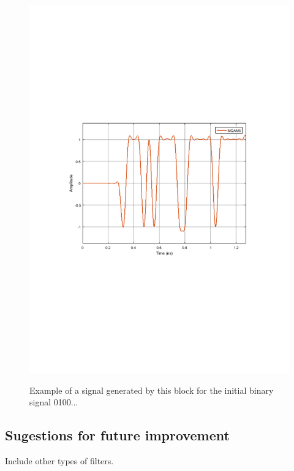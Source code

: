 \begin{figure}[h]
	\centering
	\includegraphics[clip, trim=0.5cm 9cm 0.5cm 9cm, width=\textwidth]{./lib/pulse_shaper/figures/MQAM_pulse_shaper_output.pdf}
	\label{MQAM6_DeterministicAppendZeros}\caption{Example of a signal generated by this block for the initial binary signal 0100...}
\end{figure}

\subsection*{Sugestions for future improvement}

Include other types of filters.
